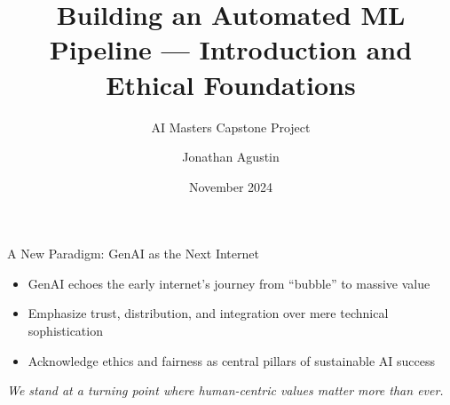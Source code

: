 \documentclass[aspectratio=169]{beamer}
\title{Building an Automated ML Pipeline — Introduction and Ethical Foundations}
\subtitle{AI Masters Capstone Project}
\author{Jonathan Agustin}
\date{November 2024}
\begin{document}
\maketitle

%
\begin{frame}{A New Paradigm: GenAI as the Next Internet}
\begin{itemize}
\item GenAI echoes the early internet’s journey from ``bubble'' to massive value
\item Emphasize trust, distribution, and integration over mere technical sophistication
\item Acknowledge ethics and fairness as central pillars of sustainable AI success
\end{itemize}

\vspace{0.8em}
\emph{We stand at a turning point where human-centric values matter more than ever.}
\end{frame}
\end{document}
